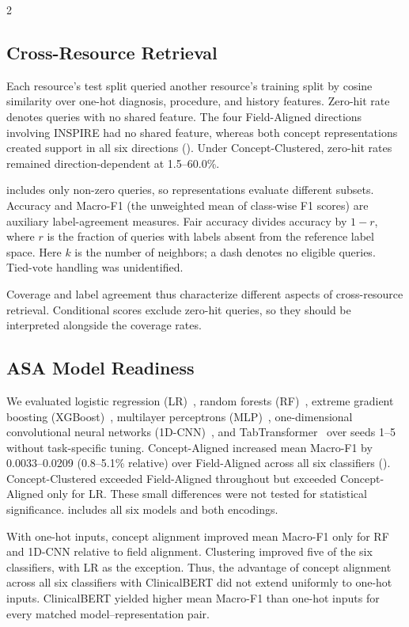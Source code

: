 \documentclass[a4paper,conference]{IEEEtran}
\newcommand{\fieldaligned}{Field-Aligned}
\newcommand{\conceptaligned}{Concept-Aligned}
\newcommand{\conceptclustered}{Concept-Clustered}
\begin{document}
\begin{multicols}{2}
\raggedcolumns
\subsection{Cross-Resource Retrieval}
Each resource's test split queried another resource's training split by cosine similarity over one-hot diagnosis, procedure, and history features. Zero-hit rate denotes queries with no shared feature. The four \fieldaligned{} directions involving INSPIRE had no shared feature, whereas both concept representations created support in all six directions (). Under \conceptclustered{}, zero-hit rates remained direction-dependent at 1.5--60.0\%.

 includes only non-zero queries, so representations evaluate different subsets. Accuracy and Macro-F1 (the unweighted mean of class-wise F1 scores) are auxiliary label-agreement measures. Fair accuracy divides accuracy by $1-r$, where $r$ is the fraction of queries with labels absent from the reference label space. Here $k$ is the number of neighbors; a dash denotes no eligible queries. Tied-vote handling was unidentified.

Coverage and label agreement thus characterize different aspects of cross-resource retrieval. Conditional scores exclude zero-hit queries, so they should be interpreted alongside the coverage rates.

\columnbreak
\subsection{ASA Model Readiness}
We evaluated logistic regression (LR)~\cite{cox_logistic}, random forests (RF)~\cite{breiman_rf}, extreme gradient boosting (\mbox{XGBoost})~\cite{xgboost}, multilayer perceptrons (MLP)~\cite{backprop}, one-dimensional convolutional neural networks (\mbox{1D-CNN})~\cite{lecun_cnn}, and TabTransformer~\cite{tabtransformer} over seeds 1--5 without task-specific tuning. \conceptaligned{} increased mean Macro-F1 by 0.0033--0.0209 (0.8--5.1\% relative) over \fieldaligned{} across all six classifiers (). \conceptclustered{} exceeded \fieldaligned{} throughout but exceeded \conceptaligned{} only for LR. These small differences were not tested for statistical significance.  includes all six models and both encodings.

With one-hot inputs, concept alignment improved mean Macro-F1 only for RF and \mbox{1D-CNN} relative to field alignment. Clustering improved five of the six classifiers, with LR as the exception. Thus, the advantage of concept alignment across all six classifiers with \mbox{ClinicalBERT} did not extend uniformly to one-hot inputs. \mbox{ClinicalBERT} yielded higher mean Macro-F1 than one-hot inputs for every matched model--representation pair.
\end{multicols}
\end{document}

